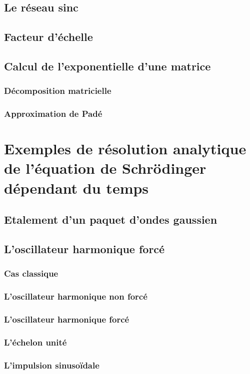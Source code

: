 \documentclass[a4paper, 12pt]{report}
\begin{document}
\section{Le réseau sinc}
\section{Facteur d’échelle}
\section{Calcul de l’exponentielle d’une matrice}
\subsection{Décomposition matricielle}
\subsection{Approximation de Padé}
\chapter{Exemples de résolution analytique
de l’équation de Schrödinger
dépendant du temps}
\section{Etalement d’un paquet d’ondes gaussien}
\section{L’oscillateur harmonique forcé}
\subsection{Cas classique}
\subsection{L’oscillateur harmonique non forcé}
\subsection{L’oscillateur harmonique forcé}
\subsection{L’échelon unité}
\subsection{L’impulsion sinusoïdale}
\end{document}
